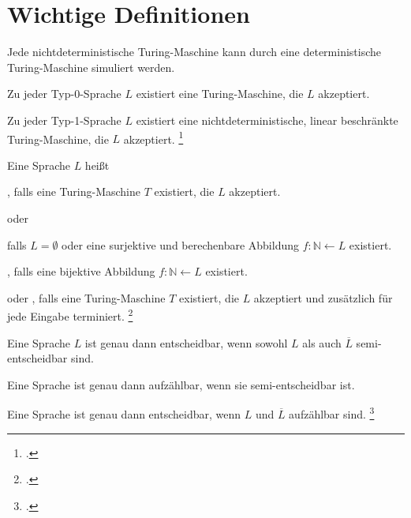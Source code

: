 \documentclass{lehramt-informatik-haupt}
\begin{document}
\section{Wichtige Definitionen}

Jede nichtdeterministische Turing-Maschine kann durch eine
deterministische Turing-Maschine simuliert werden.

Zu jeder Typ-0-Sprache $L$ existiert eine Turing-Maschine, die $L$
akzeptiert.

Zu jeder Typ-1-Sprache $L$ existiert eine nichtdeterministische, linear
beschränkte Turing-Maschine, die $L$ akzeptiert.
\footcite[Seite 35]{theo:fs:4}

Eine Sprache $L$ heißt

, falls eine Turing-Maschine $T$ existiert,
die $L$ akzeptiert.

oder

falls $L = \emptyset$ oder eine surjektive und berechenbare Abbildung
$f: \mathbb{N} \leftarrow L$ existiert.

, falls eine bijektive Abbildung $f: \mathbb{N}
\leftarrow L$ existiert.

 oder , falls eine Turing-Maschine
$T$ existiert, die $L$ akzeptiert und zusätzlich für jede Eingabe
terminiert.
\footcite[Seite 37]{theo:fs:4}

Eine Sprache $L$ ist genau dann entscheidbar, wenn sowohl $L$ als auch
$\overline{L}$ semi-entscheidbar sind.

Eine Sprache ist genau dann aufzählbar, wenn sie semi-entscheidbar ist.

Eine Sprache ist genau dann entscheidbar, wenn $L$ und $\overline{L}$
aufzählbar sind.
\footcite[Seite 39]{theo:fs:4}
\end{document}
